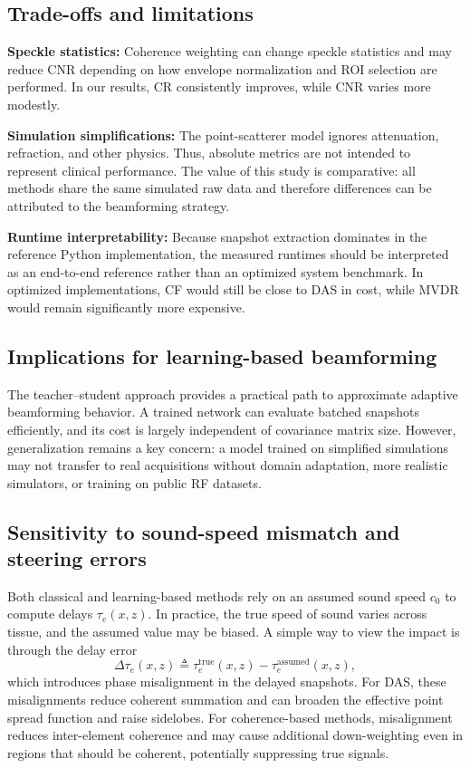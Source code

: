 \documentclass[conference]{IEEEtran}
\begin{document}
\subsection{Trade-offs and limitations}
\textbf{Speckle statistics:} Coherence weighting can change speckle statistics and may reduce CNR depending on how envelope normalization and ROI selection are performed. In our results, CR consistently improves, while CNR varies more modestly.

\textbf{Simulation simplifications:} The point-scatterer model ignores attenuation, refraction, and other physics. Thus, absolute metrics are not intended to represent clinical performance. The value of this study is comparative: all methods share the same simulated raw data and therefore differences can be attributed to the beamforming strategy.

\textbf{Runtime interpretability:} Because snapshot extraction dominates in the reference Python implementation, the measured runtimes should be interpreted as an end-to-end reference rather than an optimized system benchmark. In optimized implementations, CF would still be close to DAS in cost, while MVDR would remain significantly more expensive.

\subsection{Implications for learning-based beamforming}
The teacher--student approach provides a practical path to approximate adaptive beamforming behavior. A trained network can evaluate batched snapshots efficiently, and its cost is largely independent of covariance matrix size. However, generalization remains a key concern: a model trained on simplified simulations may not transfer to real acquisitions without domain adaptation, more realistic simulators, or training on public RF datasets.

\subsection{Sensitivity to sound-speed mismatch and steering errors}
Both classical and learning-based methods rely on an assumed sound speed $c_0$ to compute delays $\tau_e(x,z)$. In practice, the true speed of sound varies across tissue, and the assumed value may be biased. A simple way to view the impact is through the delay error
\begin{equation}
\Delta\tau_e(x,z) \triangleq \tau_e^{\text{true}}(x,z) - \tau_e^{\text{assumed}}(x,z),
\end{equation}
which introduces phase misalignment in the delayed snapshots. For DAS, these misalignments reduce coherent summation and can broaden the effective point spread function and raise sidelobes. For coherence-based methods, misalignment reduces inter-element coherence and may cause additional down-weighting even in regions that should be coherent, potentially suppressing true signals.
\end{document}
